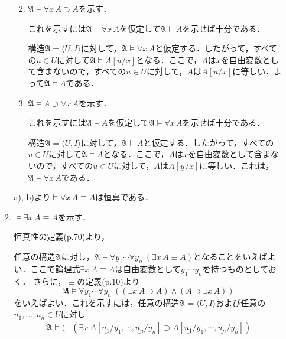 \documentclass[11pt,dvipdfmx]{jreport}
\begin{document}
\begin{enumerate}
\begin{enumerate}
\begin{enumerate}
    \renewcommand{\labelenumiii}{\alph{enumiii}) }
     \item 
      $\mathfrak{A} \models \forall x \, A \supset A$を示す．
      \par \noindent
      これを示すには$\mathfrak{A} \models \forall x \, A$を仮定して$\mathfrak{A} \models A$を示せば十分である．
      \par \noindent
      構造$\mathfrak{A} = \langle U, I \rangle$に対して，$\mathfrak{A} \models \forall x \, A$と仮定する．したがって，すべての$u \in U$に対して$\mathfrak{A} \models A[\underline{u}/x]$となる．ここで，$A$は$x$を自由変数として含まないので，すべての$u \in U$に対して，$A$は$A[\underline{u}/x]$に等しい．よって$\mathfrak{A} \models A$である．
     \item 
      $\mathfrak{A} \models A \supset \forall x \, A$を示す．
      \par \noindent
      これを示すには$\mathfrak{A} \models A$を仮定して$\mathfrak{A} \models \forall x \, A$を示せば十分である．
      \par \noindent
      構造$\mathfrak{A} = \langle U, I \rangle$に対して，$\mathfrak{A} \models A$と仮定する．したがって，すべての$u \in U$に対して$\mathfrak{A} \models A$となる．ここで，$A$は$x$を自由変数として含まないので，すべての$u \in U$に対して，$A$は$A[\underline{u}/x]$に等しい．これは，$\mathfrak{A} \models \forall x \, A$である．
    \end{enumerate}
   a), b)より$\models \forall x \, A \equiv A$は恒真である．
   \item $\models \exists x \, A \equiv A$を示す．
    \par \noindent 
    恒真性の定義(p.70)より，
    \par \noindent
    任意の構造$\mathfrak{A}$に対し，$\mathfrak{A} \models \forall y_{1} \cdots \forall y_{n} \ (\exists x \, A \equiv A)$となることをいえばよい．ここで論理式$\exists x \ A \equiv A$は自由変数として$y_{1} \cdots y_{n}$を持つものとしておく．
さらに，$\equiv$の定義(p.10)より
    \begin{equation*}
     \mathfrak{A} \models \forall y_{1} \cdots \forall y_{n} \ ((\exists x \, A \supset A) \land (A \supset \exists x \, A))
    \end{equation*}
    をいえばよい．これを示すには，任意の構造$\mathfrak{A} = \langle U, I \rangle$および任意の$u_{1}, \dots, u_{n} \in U$に対し
    \begin{align*}
     \mathfrak{A} \models ( & (\exists x \ A[ \underline{u_{1}} / y_{1}, \cdots , \underline{u_{n}} / y_{n}] \supset A[\underline{u_{1}}/y_{1}, \cdots , \underline{u_{n}}/y_{n}]) \\

\end{align*}
\end{enumerate}
\end{enumerate}
\end{document}
